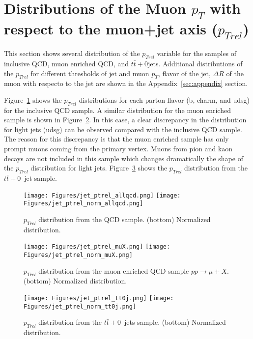 \section{Distributions of the Muon $p_T$ with
respect to the muon+jet axis ($p_{Trel}$)}

This section shows several distribution of the $p_{Trel}$ variable
for the samples of inclusive QCD, muon enriched QCD, and $t\bar{t}+0$jets.
Additional distributions of the $p_{Trel}$ for different
thresholds of jet and muon $p_T$, flavor of the jet, $\Delta R$ of the
muon with respecto to the jet are shown in the Appendix~\ref{sec:appendix} section.

Figure~\ref{fig:jet_ptrel_all_qcd} shows the $p_{Trel}$ distributions
for each parton flavor (b, charm, and udsg) for the inclusive QCD sample.
A similar distribution for the muon enriched sample is shown in
Figure~\ref{fig:jet_ptrel_all_muX}. In this case, a clear discrepancy in 
the distribution for light jets (udsg) can be observed compared with
the inclusive QCD sample. The reason for this discrepancy is that
the muon enriched sample has only prompt muons coming from the primary
vertex. Muons from pion and kaon decays are not included in this
sample which changes dramatically the shape of the $p_{Trel}$ distribution
for light jets. Figure~\ref{fig:jet_ptrel_all_ttbar} shows the 
$p_{Trel}$ distribution from the $t\bar{t}+0$~jet sample.


\begin{figure}[htbp]
  \begin{center}
    \texttt{[image: Figures/jet\_ptrel\_allqcd.png]}
    \texttt{[image: Figures/jet\_ptrel\_norm\_allqcd.png]}
  \end{center}
  \caption{$p_{Trel}$ distribution from the QCD sample. (bottom) Normalized distribution.}
  \label{fig:jet_ptrel_all_qcd}
\end{figure}


\begin{figure}[htbp]
  \begin{center}
    \texttt{[image: Figures/jet\_ptrel\_muX.png]}
    \texttt{[image: Figures/jet\_ptrel\_norm\_muX.png]}
  \end{center}
  \caption{$p_{Trel}$ distribution from the muon enriched QCD sample $pp \rightarrow \mu + X$. (bottom) Normalized distribution.}
  \label{fig:jet_ptrel_all_muX}
\end{figure}


\begin{figure}[htbp]
  \begin{center}
    \texttt{[image: Figures/jet\_ptrel\_tt0j.png]}
    \texttt{[image: Figures/jet\_ptrel\_norm\_tt0j.png]}
  \end{center}
  \caption{$p_{Trel}$ distribution from the $t\bar{t}+0$~jets sample. (bottom) Normalized distribution.}
  \label{fig:jet_ptrel_all_ttbar}
\end{figure}


\clearpage

